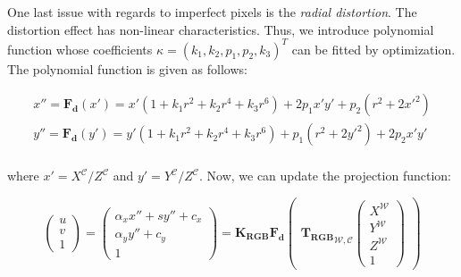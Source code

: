 \documentclass[a4paper]{report}
\numberwithin{figure}{section}
\begin{document}
One last issue with regards to imperfect pixels is the \textit{radial 
distortion}.  The distortion effect has non-linear characteristics. Thus, we 
introduce polynomial function whose coefficients $\kappa = (k_1, k_2, p_1, 
p_2, k_3)^T$ can be fitted by optimization. The polynomial function is given 
as follows:

\begin{equation}
\begin{split}
  x'' = \mathbf{F_{d}}(x') = 
  x'(1+ k_1 r^2 + k_2 r^4 + k_3 r^6) + 2 p_1 x' y' + p_2 (r^2+2x'^2)\\
  y'' = \mathbf{F_{d}}(y') = 
  y'(1+ k_1 r^2 + k_2 r^4 + k_3 r^6) + p_1 (r^2+2y'^2) + 2p_2 x'y'\\
\end{split}
\end{equation}

where $x' = X^{\mathcal{C}}/Z^{\mathcal{C}}$ and $y' = 
Y^{\mathcal{C}}/Z^{\mathcal{C}}$. Now, we 
can update 
the 
projection function:

\begin{equation}
  \begin{pmatrix}
    u\\
    v\\
    1
  \end{pmatrix}
  =
  \begin{pmatrix}
    \alpha_x x'' + sy''+ c_x\\
    \alpha_y y'' + c_y\\
    1
  \end{pmatrix}
    =
    \mathbf{K_{RGB}}
    \mathbf{F_{d}}\begin{pmatrix}
       {\mathbf{T_{RGB}}}_{\mathcal{W}, \mathcal{C}}
      \begin{pmatrix}
        X^{\mathcal{W}}\\
        Y^{\mathcal{W}}\\
        Z^{\mathcal{W}}\\
        1
      \end{pmatrix}
    \end{pmatrix}\label{eq:proj_func_w_f_c}
\end{equation} 
\end{document}
